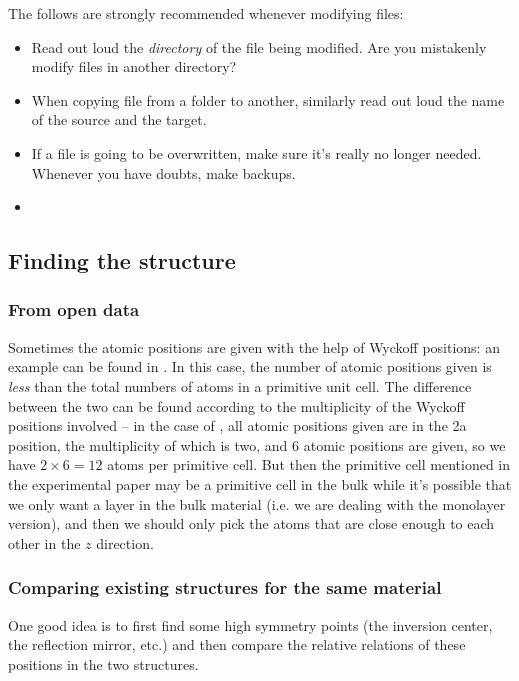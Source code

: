 \documentclass[hyperref, a4paper]{report}
\begin{document}
The follows are strongly recommended whenever modifying files:
\begin{itemize}
    \item Read out loud the \emph{directory} of the file being modified.
    Are you mistakenly modify files in another directory?
    \item When copying file from a folder to another,
    similarly read out loud the name of the source and the target.
    \item If a file is going to be overwritten,
    make sure it's really no longer needed.
    Whenever you have doubts, 
    make backups.
    \item 
\end{itemize}

\subsection{Finding the structure}

\subsubsection{From open data}

Sometimes the atomic positions are given with the help of Wyckoff positions:
an example can be found in \cite{mar1992metal}.
In this case, 
the number of atomic positions given is \emph{less} than 
the total numbers of atoms in a primitive unit cell.
The difference between the two can be found 
according to the multiplicity of 
the Wyckoff positions involved -- 
in the case of \cite{mar1992metal},
all atomic positions given are in the 2a position, 
the multiplicity of which is two, 
and 6 atomic positions are given, 
so we have $2 \times 6 = 12$ atoms per primitive cell. 
But then the primitive cell mentioned in the experimental paper 
may be a primitive cell in the bulk 
while it's possible that we only want a layer in the bulk material 
(i.e. we are dealing with the monolayer version),
and then we should only pick the atoms that are close enough to each other 
in the $z$ direction.

\subsubsection{Comparing existing structures for the same material}

One good idea is to first find some high symmetry points 
(the inversion center, the reflection mirror, etc.) 
and then compare the relative relations of these positions 
in the two structures.
\end{document}
